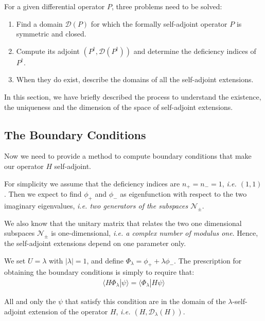 For a given differential operator $P$, three problems need to be solved:
\begin{enumerate}
    \item Find a domain $\mathcal{D}(P)$ for which the formally self-adjoint operator $P$
          is symmetric and closed.
    \item Compute its adjoint $(P^\dagger, \mathcal{D}(P^\dagger))$ and determine the
          deficiency indices of $P^\dagger$.
    \item When they do exist, describe the domains of all the self-adjoint extensions.
\end{enumerate}

\vspace{4mm}
\noindent
In this section, we have briefly described the process to understand the existence, the uniqueness and the dimension of the space of self-adjoint extensions.

\subsection{The Boundary Conditions}

Now we need to provide a method to compute boundary conditions that make our operator $H$ self-adjoint.

For simplicity we assume that the deficiency indices are $n_+ = n_- = 1$, \textit{i.e. $(1,1)$}. Then we expect to find $\phi_+$ and $\phi_-$ as eigenfunction with respect to the two imaginary eigenvalues, \textit{i.e. two generators of the subspaces $ \mathcal{N}_\pm $}.

We also know that the unitary matrix that relates the two one dimensional subspaces $ \mathcal{N}_\pm $ is one-dimensional, \textit{i.e. a complex number of modulus one}. Hence, the self-adjoint extensions depend on one parameter only.

We set $U = \lambda$ with $|\lambda| = 1$, and define $\Phi_\lambda = \phi_+ + \lambda \phi_-$. The prescription for obtaining the boundary conditions is simply to require that:
\begin{align} 
    \label{eq:boundary_condition}
    \langle H \Phi_\lambda | \psi \rangle = \langle \Phi_\lambda | H \psi \rangle
\end{align}

\noindent
All and only the $\psi$ that satisfy this condition are in the domain of the $\lambda$-self-adjoint extension of the operator $H$, \textit{i.e. $(H,\mathcal{D}_\lambda(H))$}.